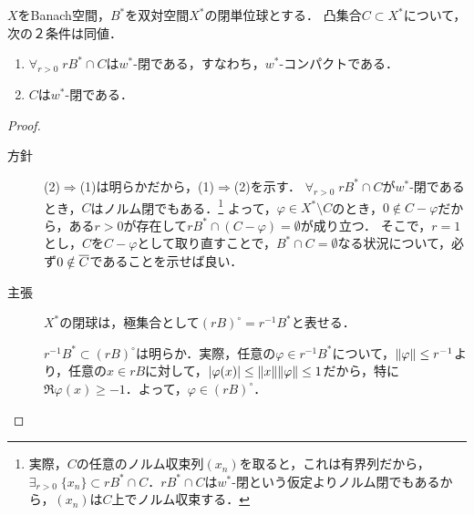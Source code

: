 \documentclass[uplatex,dvipdfmx]{jsreport}
\begin{document}
\begin{theorem}
    $X$をBanach空間，$B^*$を双対空間$X^*$の閉単位球とする．
    凸集合$C\subset X^*$について，次の２条件は同値．
    \begin{enumerate}
        \item $\forall_{r>0}\;rB^*\cap C$は$w^*$-閉である，すなわち，$w^*$-コンパクトである．
        \item $C$は$w^*$-閉である．
    \end{enumerate}
\end{theorem}
\begin{proof}\mbox{}
    \begin{description}
        \item[方針] (2)$\Rightarrow$(1)は明らかだから，(1)$\Rightarrow$(2)を示す．
        $\forall_{r>0}\;rB^*\cap C$が$w^*$-閉であるとき，$C$はノルム閉でもある．\footnote{実際，$C$の任意のノルム収束列$(x_n)$を取ると，これは有界列だから，$\exists_{r>0}\;\{x_n\}\subset rB^*\cap C$．$rB^*\cap C$は$w^*$-閉という仮定よりノルム閉でもあるから，$(x_n)$は$C$上でノルム収束する．}
        よって，$\varphi\in X^*\setminus C$のとき，$0\notin C-\varphi$だから，ある$r>0$が存在して$rB^*\cap(C-\varphi)=\emptyset$が成り立つ．
        そこで，$r=1$とし，$C$を$C-\varphi$として取り直すことで，$B^*\cap C=\emptyset$なる状況について，必ず$0\notin\overline{C}$であることを示せば良い．
        \item[主張] $X^*$の閉球は，極集合として$(rB)^\circ=r^{-1}B^*$と表せる．
        
        $r^{-1}B^*\subset(rB)^\circ$は明らか．実際，任意の$\varphi\in r^{-1}B^*$について，$\|\varphi\|\le r^{-1}$より，任意の$x\in rB$に対して，$\lvert\varphi(x)\rvert\le\|x\|\|\varphi\|\le1$だから，特に$\Re\varphi(x)\ge-1$．よって，$\varphi\in(rB)^\circ$．


\end{description}
\end{proof}
\end{document}
